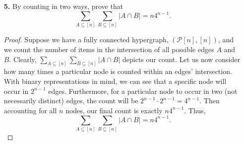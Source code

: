 \documentclass[ 12pt ]{article}
\begin{document}
\begin{enumerate}
		\begin{proof}[Induction Proof]
			As a base case, let $n = 1$, obviously we can see that the equality will hold. Let us turn to the inductive step. Suppose $\sum_{k \in [n]} k \cdot k! = (n+1)! - 1$ holds
			for an arbitrary $n \geq 1$. Now consider,
			\begin{align*}
				\sum_{k \in [n]} k \cdot k! &= (n+1)! - 1 \\
				\sum_{k \in [n]} k \cdot k! + (n+1)(n+1)! &= (n+1)! + (n+1)(n+1)! - 1 \\
				\sum_{k \in [n+1]} k \cdot k! &= (n+2)! - 1,
			\end{align*}
			concluding the inductive step.
		\end{proof}

		\begin{proof}[Combinatorial Proof]
			Suppose $n+1$ individuals have an assigned seating. Further, suppose we have the set of all possible seating arrangements such that at least one individual is not sitting
			in their own seat. Clearly we can see that $(n+1)!-1$ represents the count of our set since there is only one way all individuals can sit properly. Let us consider another
			counting by the following:
			\begin{enumerate}
				\item[\textbf{a.}] Let the first $n-k$ people take their proper seat.
				\item[\textbf{b.}] Then, let the next individual take a seat that is not their own.
				\item[\textbf{c.}] Finally, let the remaining $k$ take arbitrary seats.
			\end{enumerate}
			By these rules, we can see that all seating arrangements are accounted for when considering all possible $k$. Additionally, for each particular $k$, there are precisely
			$k \cdot k!$ arrangements. Thus, $$\sum_{k \in [n]} k \cdot k! = (n+1)! - 1.$$
		\end{proof}


	\item[\textbf{5.}] By counting in two ways, prove that $$\sum_{A \subseteq [n]} \sum_{B \subseteq [n]} |A \cap B| = n4^{n-1}.$$

		\begin{proof}
			Suppose we have a fully connected hypergraph, $( \mathcal{P}[n], [n] )$, and we count the number of items in the intersection of all possible edges $A$ and $B$. Clearly,
			$\sum_{A \subseteq [n]} \sum_{B \subseteq [n]} |A \cap B|$ depicts our count. Let us now consider how many times a particular node is counted within an edges'
			intersection. With binary representations in mind, we can see that a specific node will occur in $2^{n-1}$ edges. Furthermore, for a particular node to occur in two (not
			necessarily distinct) edges, the count will be $2^{n-1} \cdot 2^{n-1} = 4^{n-1}$. Then accounting for all $n$ nodes, our final count is exactly $n4^{n-1}$. Thus,
			$$\sum_{A \subseteq [n]} \sum_{B \subseteq [n]} |A \cap B| = n4^{n-1}.$$
		\end{proof}

\end{enumerate}
\end{document}
